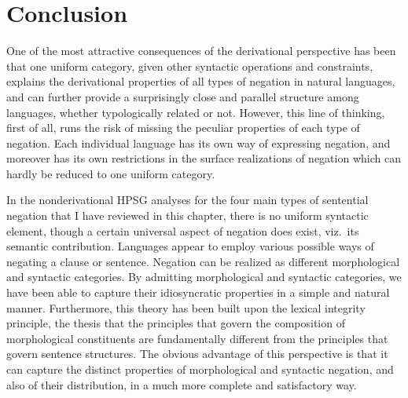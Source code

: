 \documentclass[output=paper
                ,modfonts
                		,nonflat
	        ,collection
	        ,collectionchapter
	        ,collectiontoclongg
 	        ,biblatex
                ,babelshorthands
                ,newtxmath
                ,draftmode
                ,colorlinks, citecolor=brown
]{./langsci/langscibook}
\begin{document}
{\section{Conclusion}




One of the most attractive consequences of the
derivational perspective has been that one uniform category,
given other syntactic operations and constraints,
explains the derivational properties of all types of negation
in natural languages, and can further provide a surprisingly
close and parallel structure among languages, whether typologically
related or not. However, this line of thinking, first of all, runs the risk of
missing the peculiar properties of each type of
negation. Each individual language has its own
way of expressing negation, and moreover has
its own restrictions in the surface realizations of negation which
can hardly be reduced to one uniform category.


In the nonderivational HPSG analyses for the four main
types of sentential negation that I have reviewed
in this chapter,  there is no uniform
syntactic element, though a certain universal aspect of
negation does exist, viz.\ its semantic contribution.
Languages appear to employ various possible
ways of negating a clause or sentence. Negation can
be realized as different morphological and syntactic categories.
By admitting morphological and syntactic categories,
we have been able to capture their idiosyncratic properties in a
simple and natural manner. Furthermore, this theory has been built upon
the lexical integrity principle, the thesis that the principles that govern the
composition
of morphological
constituents are fundamentally different from the principles that
govern sentence structures. The obvious advantage of
this perspective is that it can capture the distinct properties of
morphological and syntactic negation, and also of their distribution,
in a much more complete and satisfactory way.

}
\end{document}
